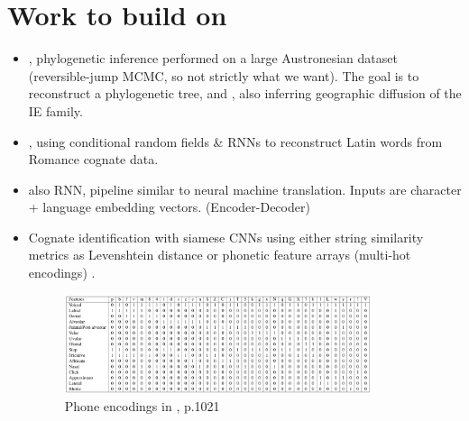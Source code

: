 \documentclass[a4paper, 10pt]{article}
\begin{document}
\section{Work to build on}
\begin{itemize}
    \item \cite{bouchard-Cote_et_al:2013}, phylogenetic inference performed on a large Austronesian dataset (reversible-jump MCMC, so not strictly what we want).
    The goal is to reconstruct a phylogenetic tree, and \cite{bouckaert_et_al:2012}, also inferring geographic diffusion of the IE family.
    \item \cite{ciobanu_ab_2018}, using conditional random fields \& RNNs \cite{ciobanu_ab_2018} to reconstruct Latin words from Romance cognate data.
    \item \cite{meloni_ab_2019} also RNN, pipeline similar to neural machine translation. Inputs are character + language embedding vectors. (Encoder-Decoder)
    \item Cognate identification with siamese CNNs using either string similarity metrics as Levenshtein distance
    \cite{wilding_cross-family_2019} or phonetic feature arrays (multi-hot encodings) \cite{rama_siamese_2016}.
    \begin{figure}[htp]
        \centering
        \includegraphics[width=0.85\textwidth]{graphics/rama_PhoneticCNN.png}
        \caption{Phone encodings in \cite{rama_siamese_2016}, p.1021}
        \label{figure:rama_2016}
    \end{figure}
\end{itemize}

\newpage
\end{document}
